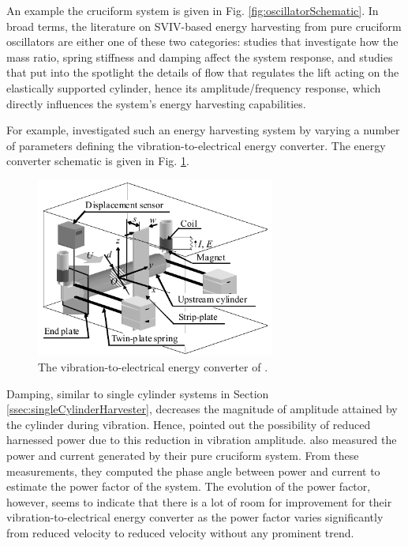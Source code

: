 \documentclass[oneside]{utmthesis}
\begin{document}
An example the cruciform system is given in Fig. \ref{fig:oscillatorSchematic}. In broad terms, the literature on SVIV-based energy harvesting from pure cruciform oscillators are either one of these two categories: studies that investigate how the mass ratio, spring stiffness and damping affect the system response, and studies that put into the spotlight the details of flow that regulates the lift acting on the elastically supported cylinder, hence its amplitude/frequency response, which directly influences the system's energy harvesting capabilities.

For example, \citet{Koide2009} investigated such an energy harvesting system by varying a number of parameters defining the vibration-to-electrical energy converter. The energy converter schematic is given in Fig. \ref{fig:coilGenerator}.

\begin{figure}[!h]
  \centering
  \hspace{1cm} \includegraphics[width=0.7\textwidth]{figs/coilGenerator}
  \caption{The vibration-to-electrical energy converter of \citet{Koide2009}.}
  \label{fig:coilGenerator}
\end{figure}

Damping, similar to single cylinder systems in Section \ref{ssec:singleCylinderHarvester}, decreases the magnitude of amplitude attained by the cylinder during vibration. Hence, \citet{Koide2009} pointed out the possibility of reduced harnessed power due to this reduction in vibration amplitude. \citet{Koide2009} also measured the power and current generated by their pure cruciform system. From these measurements, they computed the phase angle between power and current to estimate the power factor of the system. The evolution of the power factor, however, seems to indicate that there is a lot of room for improvement for their vibration-to-electrical energy converter as the power factor varies significantly from reduced velocity to reduced velocity without any prominent trend.
\end{document}
